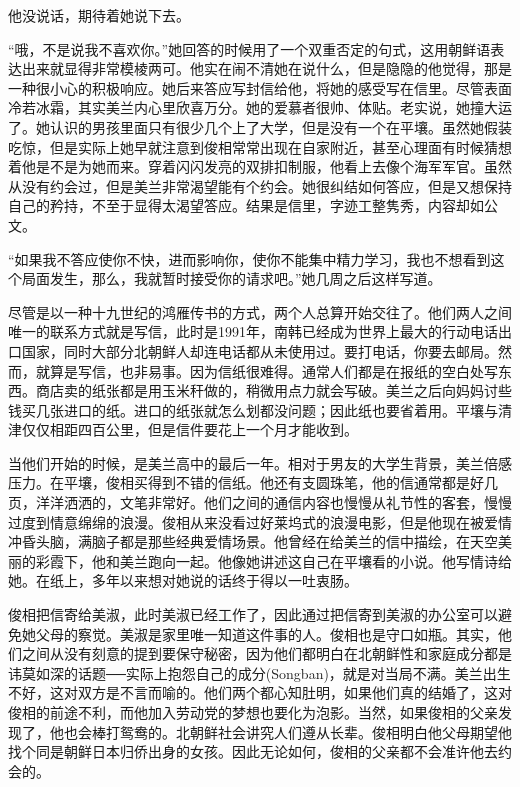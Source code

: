 他没说话，期待着她说下去。

“哦，不是说我不喜欢你。”她回答的时候用了一个双重否定的句式，这用朝鲜语表达出来就显得非常模棱两可。他实在闹不清她在说什么，但是隐隐的他觉得，那是一种很小心的积极响应。她后来答应写封信给他，将她的感受写在信里。尽管表面冷若冰霜，其实美兰内心里欣喜万分。她的爱慕者很帅、体贴。老实说，她撞大运了。她认识的男孩里面只有很少几个上了大学，但是没有一个在平壤。虽然她假装吃惊，但是实际上她早就注意到俊相常常出现在自家附近，甚至心理面有时候猜想着他是不是为她而来。穿着闪闪发亮的双排扣制服，他看上去像个海军军官。虽然从没有约会过，但是美兰非常渴望能有个约会。她很纠结如何答应，但是又想保持自己的矜持，不至于显得太渴望答应。结果是信里，字迹工整隽秀，内容却如公文。

“如果我不答应使你不快，进而影响你，使你不能集中精力学习，我也不想看到这个局面发生，那么，我就暂时接受你的请求吧。”她几周之后这样写道。

尽管是以一种十九世纪的鸿雁传书的方式，两个人总算开始交往了。他们两人之间唯一的联系方式就是写信，此时是1991年，南韩已经成为世界上最大的行动电话出口国家，同时大部分北朝鲜人却连电话都从未使用过。要打电话，你要去邮局。然而，就算是写信，也非易事。因为信纸很难得。通常人们都是在报纸的空白处写东西。商店卖的纸张都是用玉米秆做的，稍微用点力就会写破。美兰之后向妈妈讨些钱买几张进口的纸。进口的纸张就怎么划都没问题；因此纸也要省着用。平壤与清津仅仅相距四百公里，但是信件要花上一个月才能收到。

当他们开始的时候，是美兰高中的最后一年。相对于男友的大学生背景，美兰倍感压力。在平壤，俊相买得到不错的信纸。他还有支圆珠笔，他的信通常都是好几页，洋洋洒洒的，文笔非常好。他们之间的通信内容也慢慢从礼节性的客套，慢慢过度到情意绵绵的浪漫。俊相从来没看过好莱坞式的浪漫电影，但是他现在被爱情冲昏头脑，满脑子都是那些经典爱情场景。他曾经在给美兰的信中描绘，在天空美丽的彩霞下，他和美兰跑向一起。他像她讲述这自己在平壤看的小说。他写情诗给她。在纸上，多年以来想对她说的话终于得以一吐衷肠。

俊相把信寄给美淑，此时美淑已经工作了，因此通过把信寄到美淑的办公室可以避免她父母的察觉。美淑是家里唯一知道这件事的人。俊相也是守口如瓶。其实，他们之间从没有刻意的提到要保守秘密，因为他们都明白在北朝鲜性和家庭成分都是讳莫如深的话题──实际上抱怨自己的成分(Songban)，就是对当局不满。美兰出生不好，这对双方是不言而喻的。他们两个都心知肚明，如果他们真的结婚了，这对俊相的前途不利，而他加入劳动党的梦想也要化为泡影。当然，如果俊相的父亲发现了，他也会棒打鸳鸯的。北朝鲜社会讲究人们遵从长辈。俊相明白他父母期望他找个同是朝鲜日本归侨出身的女孩。因此无论如何，俊相的父亲都不会准许他去约会的。

